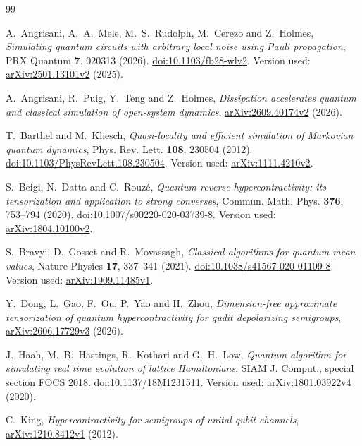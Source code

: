 \documentclass[11pt,reqno]{amsart}
\numberwithin{equation}{section}
\theoremstyle{definition}
\theoremstyle{remark}
\begin{document}
\begin{thebibliography}{99}

A.~Angrisani, A.~A.~Mele, M.~S.~Rudolph, M.~Cerezo and Z.~Holmes,
\emph{Simulating quantum circuits with arbitrary local noise using Pauli propagation},
PRX Quantum \textbf{7}, 020313 (2026).
\href{https://doi.org/10.1103/fb28-wlv2}{doi:10.1103/fb28-wlv2}.
Version used: \href{https://arxiv.org/abs/2501.13101v2}{arXiv:2501.13101v2} (2025).

A.~Angrisani, R.~Puig, Y.~Teng and Z.~Holmes,
\emph{Dissipation accelerates quantum and classical simulation of open-system dynamics},
\href{https://arxiv.org/abs/2609.40174v2}{arXiv:2609.40174v2} (2026).

T.~Barthel and M.~Kliesch,
\emph{Quasi-locality and efficient simulation of Markovian quantum dynamics},
Phys. Rev. Lett. \textbf{108}, 230504 (2012).
\href{https://doi.org/10.1103/PhysRevLett.108.230504}{doi:10.1103/PhysRevLett.108.230504}.
Version used: \href{https://arxiv.org/abs/1111.4210v2}{arXiv:1111.4210v2}.

S.~Beigi, N.~Datta and C.~Rouz\'e,
\emph{Quantum reverse hypercontractivity: its tensorization and application to strong converses},
Commun. Math. Phys. \textbf{376}, 753--794 (2020).
\href{https://doi.org/10.1007/s00220-020-03739-8}{doi:10.1007/s00220-020-03739-8}.
Version used: \href{https://arxiv.org/abs/1804.10100v2}{arXiv:1804.10100v2}.

S.~Bravyi, D.~Gosset and R.~Movassagh,
\emph{Classical algorithms for quantum mean values},
Nature Physics \textbf{17}, 337--341 (2021).
\href{https://doi.org/10.1038/s41567-020-01109-8}{doi:10.1038/s41567-020-01109-8}.
Version used: \href{https://arxiv.org/abs/1909.11485v1}{arXiv:1909.11485v1}.

Y.~Dong, L.~Gao, F.~Ou, P.~Yao and H.~Zhou,
\emph{Dimension-free approximate tensorization of quantum hypercontractivity for qudit depolarizing semigroups},
\href{https://arxiv.org/abs/2606.17729v3}{arXiv:2606.17729v3} (2026).

J.~Haah, M.~B.~Hastings, R.~Kothari and G.~H.~Low,
\emph{Quantum algorithm for simulating real time evolution of lattice Hamiltonians},
SIAM J. Comput., special section FOCS 2018.
\href{https://doi.org/10.1137/18M1231511}{doi:10.1137/18M1231511}.
Version used: \href{https://arxiv.org/abs/1801.03922v4}{arXiv:1801.03922v4} (2020).

C.~King,
\emph{Hypercontractivity for semigroups of unital qubit channels},
\href{https://arxiv.org/abs/1210.8412v1}{arXiv:1210.8412v1} (2012).


\end{thebibliography}
\end{document}
